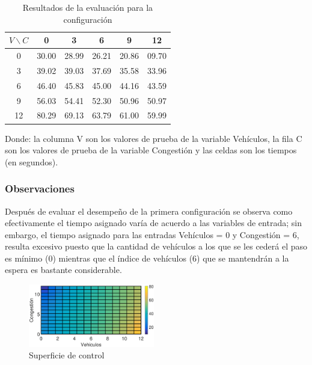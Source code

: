 \begin{table}[H]
	\centering
	\begin{tabular}{cccccc} \toprule
		$V \backslash C$ &  0 & 3 & 6 & 9 & 12 \\ \midrule
		0 & 30.00 & 28.99 & 26.21 & 20.86 & 09.70 \\
		3 & 39.02 & 39.03 & 37.69 & 35.58 & 33.96 \\
		6 & 46.40 & 45.83 & 45.00 & 44.16 & 43.59 \\
		9 & 56.03 & 54.41 & 52.30 & 50.96 & 50.97 \\
		12& 80.29 & 69.13 & 63.79 & 61.00 & 59.99 \\
	\end{tabular}
	\caption{Resultados de la evaluación para la configuración}
\end{table}
Donde: la columna V son los valores de prueba de la variable Vehículos, la fila C son los valores de  prueba de la variable Congestión y las celdas son los tiempos (en segundos).




\subsubsection{Observaciones}
\begin{multicols}{2}

Después de evaluar el desempeño de la primera configuración se observa como efectivamente el tiempo asignado varía de acuerdo a las variables de entrada; sin embargo, el tiempo asignado para las entradas Vehículos = 0 y Congestión = 6, resulta excesivo puesto que la cantidad de vehículos a los que se les cederá el paso es mínimo (0) mientras que el índice de vehículos (6) que se mantendrán a la espera es bastante considerable.

\begin{figure}[H]
	\includegraphics[width=0.49\textwidth]{Surfaces/Surface2D_A.eps}
	\caption{Superficie de control}
\end{figure}

\end{multicols}

